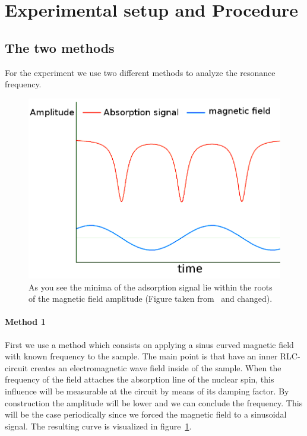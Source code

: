 \section{Experimental setup and Procedure}
\subsection{The two methods}
For the experiment we use two different methods to analyze the
resonance frequency.
\begin{figure}[htpb]
    \centering
    \includegraphics[width=0.7\linewidth]{figures/method1}
    \caption{As you see the minima of the adsorption signal lie within
        the roots of the magnetic field amplitude (Figure
            taken from~\cite{ver} and changed).}
    \label{fig:method1}
\end{figure}
\paragraph{Method 1} First we use a method which consists on applying a 
sinus curved magnetic field with known frequency to the sample. 
The main point is that have an inner RLC-circuit creates an electromagnetic
wave field inside of the sample. When the frequency of the field attaches
the absorption line of the nuclear spin, this influence will be measurable
at the circuit by means of its damping factor. By construction the 
amplitude will be lower and we can conclude the frequency. This will
be the case periodically since we forced the magnetic field to a 
sinusoidal signal. The resulting curve is visualized 
in figure~\ref{fig:method1}. \\\\
